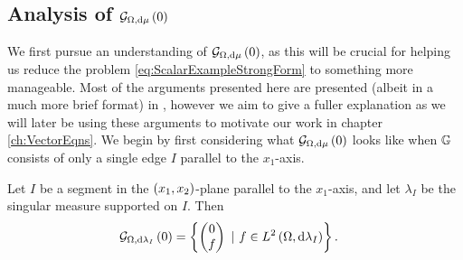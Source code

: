 \subsection{Analysis of $\mathcal{G}_{ \Omega, \mathrm{d}\mu}\left( 0 \right)$}
We first pursue an understanding of $\mathcal{G}_{ \Omega, \mathrm{d}\mu}\left( 0 \right)$, as this will be crucial for helping us reduce the problem \eqref{eq:ScalarExampleStrongForm} to something more manageable.
Most of the arguments presented here are presented (albeit in a much more brief format) in \cite{zhikov2000extension}, however we aim to give a fuller explanation as we will later be using these arguments to motivate our work in chapter \ref{ch:VectorEqns}.
We begin by first considering what $\mathcal{G}_{ \Omega, \mathrm{d}\mu}\left( 0 \right)$ looks like when $\mathbb{G}$ consists of only a single edge $I$ parallel to the $x_1$-axis.

\begin{prop} \label{prop:GradZeroParallelZhikov}
	Let $I$ be a segment in the $\left( x_1,x_2 \right)$-plane parallel to the $x_1$-axis, and let $\lambda_I$ be the singular measure supported on $I$.
	Then 
	\begin{align*}
		\mathcal{G}_{ \Omega, \mathrm{d}\lambda_I}\left( 0 \right) &= 
		\left\{ 
			\begin{pmatrix} 0 \\ f	\end{pmatrix}
			\ \vert \ f\in L^{2}\left( \Omega,\mathrm{d}\lambda_I \right)
		 \right\}.
	\end{align*}
\end{prop}
